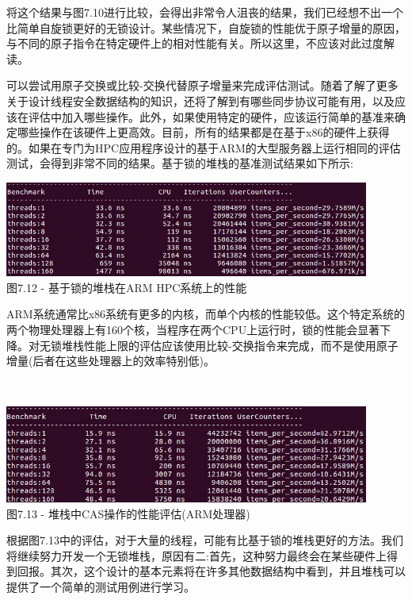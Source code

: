 将这个结果与图7.10进行比较，会得出非常令人沮丧的结果，我们已经想不出一个比简单自旋锁更好的无锁设计。某些情况下，自旋锁的性能优于原子增量的原因，与不同的原子指令在特定硬件上的相对性能有关。所以这里，不应该对此过度解读。

可以尝试用原子交换或比较-交换代替原子增量来完成评估测试。随着了解了更多关于设计线程安全数据结构的知识，还将了解到有哪些同步协议可能有用，以及应该在评估中加入哪些操作。此外，如果使用特定的硬件，应该运行简单的基准来确定哪些操作在该硬件上更高效。目前，所有的结果都是在基于x86的硬件上获得的。如果在专门为HPC应用程序设计的基于ARM的大型服务器上运行相同的评估测试，会得到非常不同的结果。基于锁的堆栈的基准测试结果如下所示:

\begin{center}
\includegraphics[width=0.9\textwidth]{content/2/chapter7/images/12.jpg}\\
图7.12 - 基于锁的堆栈在ARM HPC系统上的性能
\end{center}

ARM系统通常比x86系统有更多的内核，而单个内核的性能较低。这个特定系统的两个物理处理器上有160个核，当程序在两个CPU上运行时，锁的性能会显著下降。对无锁堆栈性能上限的评估应该使用比较-交换指令来完成，而不是使用原子增量(后者在这些处理器上的效率特别低)。

\hspace*{\fill} \\ %
\begin{center}
\includegraphics[width=0.9\textwidth]{content/2/chapter7/images/13.jpg}\\
图7.13 - 堆栈中CAS操作的性能评估(ARM处理器)
\end{center}

根据图7.13中的评估，对于大量的线程，可能有比基于锁的堆栈更好的方法。我们将继续努力开发一个无锁堆栈，原因有二:首先，这种努力最终会在某些硬件上得到回报。其次，这个设计的基本元素将在许多其他数据结构中看到，并且堆栈可以提供了一个简单的测试用例进行学习。

